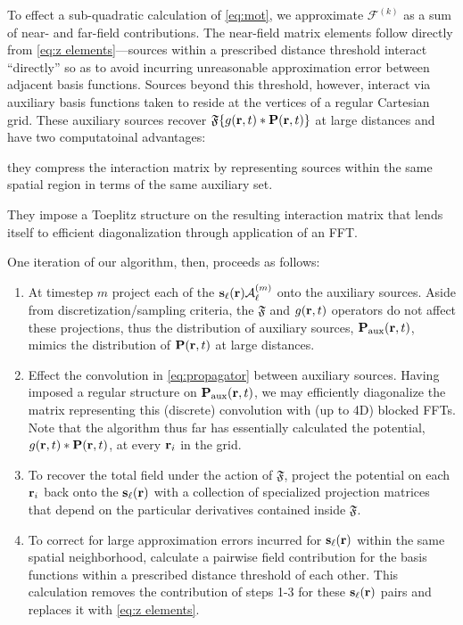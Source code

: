 To effect a sub-quadratic calculation of \cref{eq:mot}, we approximate $\mathcal{F}^{(k)}$ as a sum of near- and far-field contributions.
The near-field matrix elements follow directly from \cref{eq:z elements}---sources within a prescribed distance threshold interact ``directly'' so as to avoid incurring unreasonable approximation error between adjacent basis functions.
Sources beyond this threshold, however, interact via auxiliary basis functions taken to reside at the vertices of a regular Cartesian grid.
These auxiliary sources recover $\mathfrak{F}\qty{g(\vb{r}, t) \ast \vb{P}(\vb{r}, t)}$ at large distances and have two computatoinal advantages:
\begin{inparaenum}[(i)]
  \item they compress the interaction matrix by representing sources within the same spatial region in terms of the same auxiliary set.
  \item They impose a Toeplitz structure on the resulting interaction matrix that lends itself to efficient diagonalization through application of an FFT.
\end{inparaenum}
One iteration of our algorithm, then, proceeds as follows:
\begin{enumerate}
  \item At timestep $m$ project each of the $\vb{s}_\ell(\vb{r}) \mathcal{A}^\qty(m)_\ell$ onto the auxiliary sources.
    Aside from discretization/sampling criteria, the $\mathfrak{F}$ and $g(\vb{r}, t)$ operators do not affect these projections, thus the distribution of auxiliary sources, $\vb{P}_\text{aux}(\vb{r}, t)$, mimics the distribution of $\vb{P}(\vb{r}, t)$ at large distances.
  \item Effect the convolution in \cref{eq:propagator} between auxiliary sources.
    Having imposed a regular structure on $\vb{P}_\text{aux}(\vb{r}, t)$, we may efficiently diagonalize the matrix representing this (discrete) convolution with (up to 4D) blocked FFTs.
    Note that the algorithm thus far has essentially calculated the potential, $g(\vb{r}, t) \ast \vb{P}(\vb{r}, t)$, at every $\vb{r}_i$ in the grid.
  \item To recover the total field under the action of $\mathfrak{F}$, project the potential on each $\vb{r}_i$ back onto the $\vb{s}_\ell(\vb{r})$ with a collection of specialized projection matrices that depend on the particular derivatives contained inside $\mathfrak{F}$.
  \item To correct for large approximation errors incurred for $\vb{s}_\ell(\vb{r})$ within the same spatial neighborhood, calculate a pairwise field contribution for the basis functions within a prescribed distance threshold of each other.
    This calculation removes the contribution of steps 1-3 for these $\vb{s}_\ell(\vb{r})$ pairs and replaces it with \cref{eq:z elements}.
\end{enumerate}
